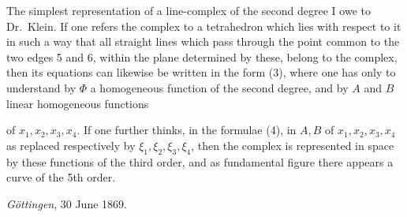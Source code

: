 \documentclass{article}
\begin{document}
The simplest representation of a line-complex of the second degree I owe to Dr.\ Klein. If one refers the complex to a tetrahedron which lies with respect to it in such a way that all straight lines which pass through the point common to the two edges 5 and 6, within the plane determined by these, belong to the complex, then its equations can likewise be written in the form (3), where one has only to understand by $\Phi$ a homogeneous function of the second degree, and by $A$ and $B$ linear homogeneous functions

of $x_1, x_2, x_3, x_4$. If one further thinks, in the formulae (4), in $A, B$ of $x_1, x_2, x_3, x_4$ as replaced respectively by $\xi_1, \xi_2, \xi_3, \xi_4$, then the complex is represented in space by these functions of the third order, and as fundamental figure there appears a curve of the 5th order.

\emph{Göttingen}, 30 June 1869.
\end{document}
